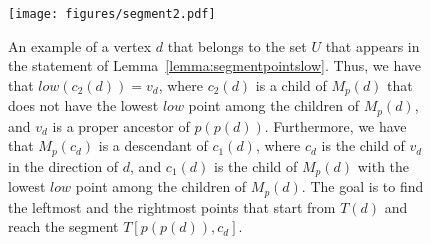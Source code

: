 \documentclass[11pt,a4paper]{article}
\begin{document}
\begin{figure}[h!]\centering
\texttt{[image: figures/segment2.pdf]}
\caption{\small{An example of a vertex $d$ that belongs to the set $U$ that appears in the statement of Lemma~\ref{lemma:segmentpointslow}. Thus, we have that $\mathit{low}(c_2(d))=v_d$, where $c_2(d)$ is a child of $M_p(d)$ that does not have the lowest $\mathit{low}$ point among the children of $M_p(d)$, and $v_d$ is a proper ancestor of $p(p(d))$. Furthermore, we have that $M_p(c_d)$ is a descendant of $c_1(d)$, where $c_d$ is the child of $v_d$ in the direction of $d$, and $c_1(d)$ is the child of $M_p(d)$ with the lowest $\mathit{low}$ point among the children of $M_p(d)$. The goal is to find the leftmost and the rightmost points that start from $T(d)$ and reach the segment $T[p(p(d)),c_d]$.}}\label{figure:segment2}
\end{figure}
\end{document}
